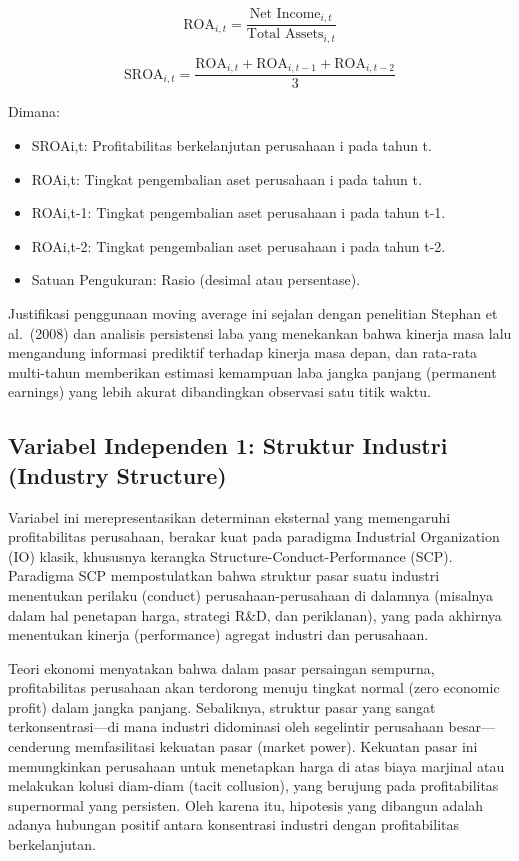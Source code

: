 \documentclass[12pt,a4paper]{report}
\providecommand{\tightlist}{%
  \setlength{\itemsep}{0pt}\setlength{\parskip}{0pt}%
}
\begin{document}
\[
\mathrm{ROA}_{i,t} = \frac{\text{Net Income}_{i,t}}{\text{Total Assets}_{i,t}}
\]

\[
\mathrm{SROA}_{i,t} = \frac{\mathrm{ROA}_{i,t} + \mathrm{ROA}_{i,t-1} + \mathrm{ROA}_{i,t-2}}{3}
\]

Dimana:

\begin{itemize}
\tightlist
\item
  SROAi,t: Profitabilitas berkelanjutan perusahaan i pada tahun t.
\item
  ROAi,t: Tingkat pengembalian aset perusahaan i pada tahun t.
\item
  ROAi,t-1: Tingkat pengembalian aset perusahaan i pada tahun t-1.
\item
  ROAi,t-2: Tingkat pengembalian aset perusahaan i pada tahun t-2.
\item
  Satuan Pengukuran: Rasio (desimal atau persentase).
\end{itemize}

Justifikasi penggunaan moving average ini sejalan dengan penelitian
Stephan et al.~(2008) dan analisis persistensi laba yang menekankan
bahwa kinerja masa lalu mengandung informasi prediktif terhadap kinerja
masa depan, dan rata-rata multi-tahun memberikan estimasi kemampuan laba
jangka panjang (permanent earnings) yang lebih akurat dibandingkan
observasi satu titik waktu.

\hypertarget{variabel-independen-1-struktur-industri-industry-structure}{%
\subsection{Variabel Independen 1: Struktur Industri (Industry
Structure)}\label{variabel-independen-1-struktur-industri-industry-structure}}

Variabel ini merepresentasikan determinan eksternal yang memengaruhi
profitabilitas perusahaan, berakar kuat pada paradigma Industrial
Organization (IO) klasik, khususnya kerangka
Structure-Conduct-Performance (SCP). Paradigma SCP mempostulatkan bahwa
struktur pasar suatu industri menentukan perilaku (conduct)
perusahaan-perusahaan di dalamnya (misalnya dalam hal penetapan harga,
strategi R\&D, dan periklanan), yang pada akhirnya menentukan kinerja
(performance) agregat industri dan perusahaan.

Teori ekonomi menyatakan bahwa dalam pasar persaingan sempurna,
profitabilitas perusahaan akan terdorong menuju tingkat normal (zero
economic profit) dalam jangka panjang. Sebaliknya, struktur pasar yang
sangat terkonsentrasi---di mana industri didominasi oleh segelintir
perusahaan besar---cenderung memfasilitasi kekuatan pasar (market
power). Kekuatan pasar ini memungkinkan perusahaan untuk menetapkan
harga di atas biaya marjinal atau melakukan kolusi diam-diam (tacit
collusion), yang berujung pada profitabilitas supernormal yang
persisten. Oleh karena itu, hipotesis yang dibangun adalah adanya
hubungan positif antara konsentrasi industri dengan profitabilitas
berkelanjutan.
\end{document}
